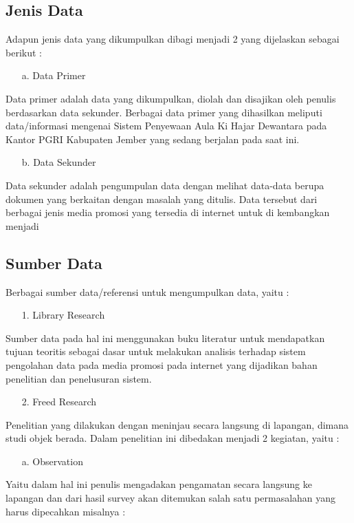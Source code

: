 \documentclass{jtetiproposalskripsi}
\begin{document}
\subsection{Jenis Data}
Adapun jenis data yang dikumpulkan dibagi menjadi 2 yang dijelaskan sebagai berikut :
\begin{itemize}
\item[a.] Data Primer
\end{itemize}
Data primer adalah data yang dikumpulkan, diolah dan disajikan oleh penulis berdasarkan data sekunder. Berbagai data primer yang dihasilkan meliputi data/informasi mengenai Sistem Penyewaan Aula Ki Hajar Dewantara pada Kantor PGRI Kabupaten Jember yang sedang berjalan pada saat ini.
\begin{itemize}
\item[b.] Data Sekunder
\end{itemize}
Data sekunder adalah pengumpulan data dengan melihat data-data berupa dokumen yang berkaitan dengan masalah yang ditulis. Data tersebut dari berbagai jenis media promosi yang tersedia di internet untuk di kembangkan menjadi


\subsection{Sumber Data}
Berbagai sumber data/referensi untuk mengumpulkan data, yaitu :
\begin{itemize}
\item[1.] Library Research
\end{itemize}
Sumber data pada hal ini menggunakan buku literatur untuk mendapatkan tujuan teoritis sebagai dasar untuk melakukan analisis terhadap sistem pengolahan data pada media promosi pada internet yang dijadikan bahan penelitian dan penelusuran sistem.
\begin{itemize}
\item[2.] Freed Research
\end{itemize}

Penelitian yang dilakukan dengan meninjau secara langsung di lapangan, dimana studi objek berada. Dalam penelitian ini dibedakan menjadi 2 kegiatan, yaitu :

\begin{itemize}
\item[a.] Observation
\end{itemize}

Yaitu dalam hal ini penulis mengadakan pengamatan secara langsung ke lapangan dan dari hasil survey akan ditemukan salah satu permasalahan yang harus dipecahkan misalnya :
\end{document}

